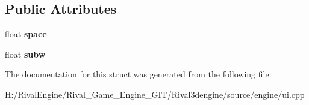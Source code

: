 \subsection*{Public Attributes}
\begin{DoxyCompactItemize}
\item 
\mbox{\label{struct_u_i_1_1_horizontal_list_a57e0e7fc094d5d4f7a19d90d5fb9529d}} 
float {\bfseries space}
\item 
\mbox{\label{struct_u_i_1_1_horizontal_list_aaf20c385cd68973db7ee04ae1686d88e}} 
float {\bfseries subw}
\end{DoxyCompactItemize}


The documentation for this struct was generated from the following file\+:\begin{DoxyCompactItemize}
\item 
H\+:/\+Rival\+Engine/\+Rival\+\_\+\+Game\+\_\+\+Engine\+\_\+\+G\+I\+T/\+Rival3dengine/source/engine/ui.\+cpp\end{DoxyCompactItemize}
